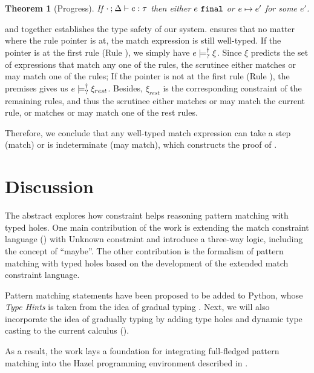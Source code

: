 \documentclass[acmsmall,screen,review,nonacm]{acmart}
\theoremstyle{slplain}
\newtheorem{thm}{Theorem}  %
\numberwithin{thm}{section}
\begin{document}
\begin{thm}[Progress]
 \label{thrm:progress}
 If $\cdot \mathbin{;} \Delta \vdash e : \tau$ then either $e ~\mathtt{final}$ or $e \mapsto e'$ for some $e'$.
\end{thm}

 and  together establishes the type safety of our system.
 ensures that no matter where the rule pointer is at, the match expression is still well-typed.
If the pointer is at the first rule (Rule \TMatchZPre), we simply have $e \models_{?}^{\dag} \xi$. Since $\xi$ predicts the set of expressions that match any one of the rules, the scrutinee either matches or may match one of the rules;
If the pointer is not at the first rule (Rule \TMatchNZPre), the premises gives us $e \models_{?}^{\dag} \xi_{rest}$. Besides, $\xi_{rest}$ is the corresponding constraint of the remaining rules, and thus the scrutinee either matches or may match the current rule, or matches or may match one of the rest rules.

Therefore, we conclude that any well-typed match expression can take a step (match) or is indeterminate (may match), which constructs the proof of .

\section{Discussion}
The abstract explores how constraint helps reasoning pattern matching with typed holes.
One main contribution of the work is extending the match constraint language (\cite{Harper2012}) with Unknown constraint and introduce a three-way logic, including the concept of ``maybe''. The other contribution is the formalism of pattern matching with typed holes based on the development of the extended match constraint language.

Pattern matching statements have been proposed to be added to \textsf{Python}, whose \emph{Type Hints} is taken from the idea of gradual typing \cite{pep484,pep622}.
Next, we will also incorporate the idea of gradually typing by adding type holes and dynamic type casting to the current calculus (\cite{Siek2006}).

As a result, the work lays a foundation for integrating full-fledged pattern matching into the \textsf{Hazel} programming environment described in \citet{DBLP:journals/pacmpl/OmarVCH19}.

\clearpage



\end{document}
